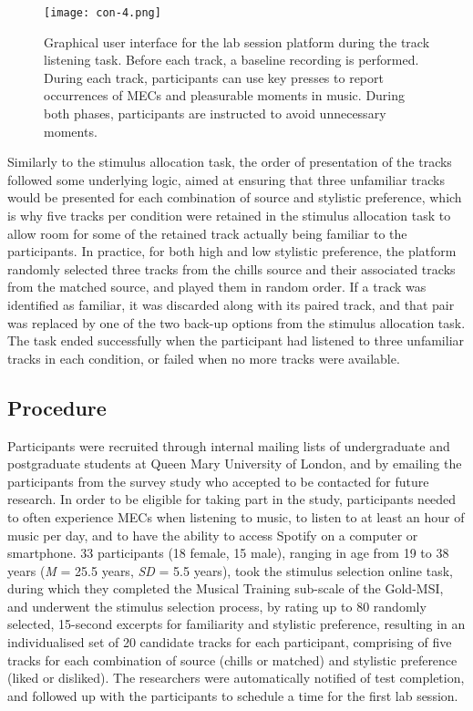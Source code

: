 \begin{figure}[t!]
\texttt{[image: con-4.png]}
\centering
\caption{Graphical user interface for the lab session platform during the track listening task. Before each track, a baseline recording is performed. During each track, participants can use key presses to report occurrences of MECs and pleasurable moments in music. During both phases, participants are instructed to avoid unnecessary moments.}
\label{fig:con-4}
\end{figure}

Similarly to the stimulus allocation task, the order of presentation of the tracks followed some underlying logic, aimed at ensuring that three unfamiliar tracks would be presented for each combination of source and stylistic preference, which is why five tracks per condition were retained in the stimulus allocation task to allow room for some of the retained track actually being familiar to the participants. In practice, for both high and low stylistic preference, the platform randomly selected three tracks from the chills source and their associated tracks from the matched source, and played them in random order. If a track was identified as familiar, it was discarded along with its paired track, and that pair was replaced by one of the two back-up options from the stimulus allocation task. The task ended successfully when the participant had listened to three unfamiliar tracks in each condition, or failed when no more tracks were available.

\subsection{Procedure}

Participants were recruited through internal mailing lists of undergraduate and postgraduate students at Queen Mary University of London, and by emailing the participants from the survey study who accepted to be contacted for future research. In order to be eligible for taking part in the study, participants needed to often experience MECs when listening to music, to listen to at least an hour of music per day, and to have the ability to access Spotify on a computer or smartphone. 33 participants (18 female, 15 male), ranging in age from 19 to 38 years (\emph{M} = 25.5 years, \emph{SD} = 5.5 years), took the stimulus selection online task, during which they completed the Musical Training sub-scale of the Gold-MSI, and underwent the stimulus selection process, by rating up to 80 randomly selected, 15-second excerpts for familiarity and stylistic preference, resulting in an individualised set of 20 candidate tracks for each participant, comprising of five tracks for each combination of source (chills or matched) and stylistic preference (liked or disliked). The researchers were automatically notified of test completion, and followed up with the participants to schedule a time for the first lab session.

